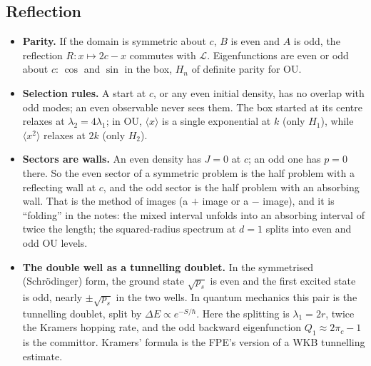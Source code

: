 \documentclass[11pt]{article}
\newcommand{\Lop}{\mathcal{L}}
\begin{document}
\subsection{Reflection}
\begin{itemize}
  \item \textbf{Parity.} If the domain is symmetric about $c$, $B$ is even and $A$ is odd, the reflection $R:x\mapsto2c-x$
        commutes with $\Lop$. Eigenfunctions are even or odd about $c$: $\cos$ and $\sin$ in the box, $H_n$ of definite parity
        for OU.
  \item \textbf{Selection rules.} A start at $c$, or any even initial density, has no overlap with odd modes; an even
        observable never sees them. The box started at its centre relaxes at $\lambda_2=4\lambda_1$; in OU, $\langle x\rangle$
        is a single exponential at $k$ (only $H_1$), while $\langle x^2\rangle$ relaxes at $2k$ (only $H_2$).
  \item \textbf{Sectors are walls.} An even density has $J=0$ at $c$; an odd one has $p=0$ there. So the even sector of a
        symmetric problem is the half problem with a reflecting wall at $c$, and the odd sector is the half problem with an
        absorbing wall. That is the method of images (a $+$ image or a $-$ image), and it is ``folding'' in the notes: the
        mixed interval unfolds into an absorbing interval of twice the length; the squared-radius spectrum at $d=1$ splits
        into even and odd OU levels.
  \item \textbf{The double well as a tunnelling doublet.} In the symmetrised (Schr\"odinger) form, the ground state
        $\sqrt{p_s}$ is even and the first excited state is odd, nearly $\pm\sqrt{p_s}$ in the two wells. In quantum
        mechanics this pair is the tunnelling doublet, split by $\Delta E\propto e^{-S/\hbar}$. Here the splitting is
        $\lambda_1=2r$, twice the Kramers hopping rate, and the odd backward eigenfunction $Q_1\approx2\pi_c-1$ is the
        committor. Kramers' formula is the FPE's version of a WKB tunnelling estimate.
\end{itemize}
\end{document}
